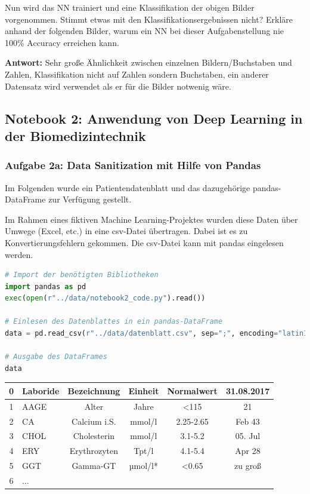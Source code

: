 \documentclass[a4paper,10pt,titlepage]{scrartcl}
\begin{document}
Nun wird das NN trainiert und eine Klassifikation der obigen Bilder vorgenommen. Stimmt etwas mit den Klassifikationsergebnissen nicht? Erkläre anhand der folgenden Bilder, warum ein NN bei dieser Aufgabenstellung nie 100\% Accuracy erreichen kann.

\textbf{Antwort:} Sehr große Ähnlichkeit zwischen einzelnen Bildern/Buchstaben und Zahlen, Klassifikation nicht auf Zahlen sondern Buchstaben, ein anderer Datensatz wird verwendet als er für die Bilder notwenig wäre.

\subsection{Notebook 2: Anwendung von Deep Learning in der Biomedizintechnik}
\subsubsection{Aufgabe 2a: Data Sanitization mit Hilfe von Pandas}
Im Folgenden wurde ein Patientendatenblatt und das dazugehörige pandas-DataFrame zur Verfügung gestellt.

Im Rahmen eines fiktiven Machine Learning-Projektes wurden diese Daten über Umwege (Excel, etc.) in eine csv-Datei übertragen. Dabei ist es zu Konvertierungsfehlern gekommen. Die csv-Datei kann mit pandas eingelesen werden.

\begin{lstlisting}[language=python]
# Import der benötigten Bibliotheken
import pandas as pd
exec(open(r"../data/notebook2_code.py").read())

# Einlesen des Datenblattes in ein pandas-DataFrame
data = pd.read_csv(r"../data/datenblatt.csv", sep=";", encoding="latin1")

# Ausgabe des DataFrames
data
\end{lstlisting}

\begin{tabular}{c|l|c|c|c|c}
    0 & Laboride & Bezeichnung  & Einheit & Normalwert & 31.08.2017 \\\hline
    1 & AAGE     & Alter        & Jahre   & <115       & 21         \\
    2 & CA       & Calcium i.S. & mmol/l  & 2.25-2.65  & Feb 43     \\
    3 & CHOL     & Cholesterin  & mmol/l  & 3.1-5.2    & 05. Jul    \\
    4 & ERY      & Erythrozyten & Tpt/l   & 4.1-5.4    & Apr 28     \\
    5 & GGT      & Gamma-GT     & µmol/l* & <0.65      & zu groß    \\
    6 & ...
\end{tabular}
\end{document}
